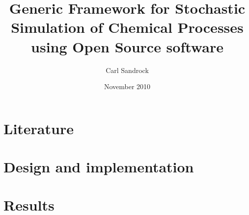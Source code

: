 \documentclass[a4paper, 12pt, %
pdftex]{report} %
\title{Generic Framework for Stochastic Simulation of Chemical Processes using Open Source software}
\author{Carl Sandrock}
\date{November 2010}
\begin{document}



\pagestyle{headings}
\setcounter{page}{1}


\part{Literature}







\part{Design and implementation}


\part{Results}



\appendix
%
%
%
%


\end{document}
